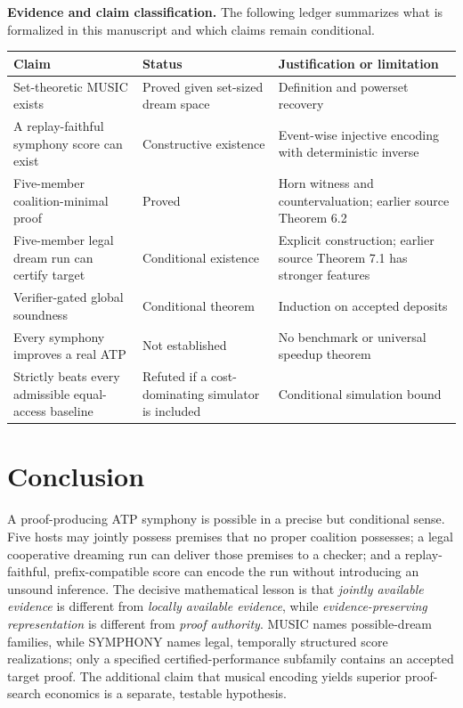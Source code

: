 \documentclass[11pt,letterpaper]{article}
\theoremstyle{definition}
\theoremstyle{remark}
\begin{document}
\noindent\textbf{Evidence and claim classification.} The following ledger summarizes what is formalized in this manuscript and which claims remain conditional.
\begin{center}\small
\begin{tabularx}{\textwidth}{@{}>{\raggedright\arraybackslash}p{}>{\raggedright\arraybackslash}p{}>{\raggedright\arraybackslash}X@{}}
\toprule
\textbf{Claim} & \textbf{Status} & \textbf{Justification or limitation}\\
\midrule
Set-theoretic MUSIC exists & Proved given set-sized dream space & Definition and powerset recovery\\
A replay-faithful symphony score can exist & Constructive existence & Event-wise injective encoding with deterministic inverse\\
Five-member coalition-minimal proof & Proved & Horn witness and countervaluation; earlier source Theorem 6.2\\
Five-member legal dream run can certify target & Conditional existence & Explicit construction; earlier source Theorem 7.1 has stronger features\\
Verifier-gated global soundness & Conditional theorem & Induction on accepted deposits\\
Every symphony improves a real ATP & Not established & No benchmark or universal speedup theorem\\
Strictly beats every admissible equal-access baseline & Refuted if a cost-dominating simulator is included & Conditional simulation bound\\
\bottomrule
\end{tabularx}
\end{center}

\section{Conclusion}
A proof-producing ATP symphony is possible in a precise but conditional sense. Five hosts may jointly possess premises that no proper coalition possesses; a legal cooperative dreaming run can deliver those premises to a checker; and a replay-faithful, prefix-compatible score can encode the run without introducing an unsound inference. The decisive mathematical lesson is that \emph{jointly available evidence} is different from \emph{locally available evidence}, while \emph{evidence-preserving representation} is different from \emph{proof authority}. MUSIC names possible-dream families, while SYMPHONY names legal, temporally structured score realizations; only a specified certified-performance subfamily contains an accepted target proof. The additional claim that musical encoding yields superior proof-search economics is a separate, testable hypothesis.
\end{document}
